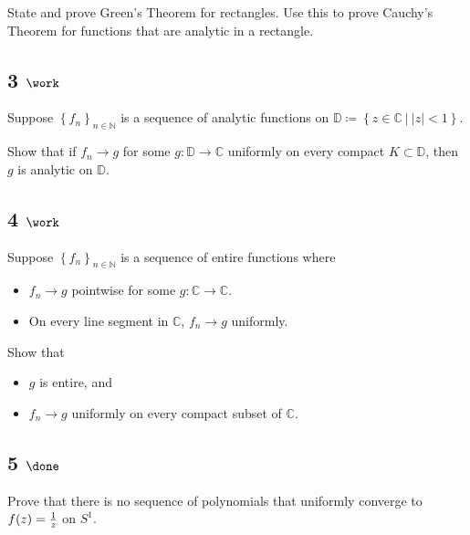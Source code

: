 State and prove Green's Theorem for rectangles. Use this to prove
Cauchy's Theorem for functions that are analytic in a rectangle.

\hypertarget{work-18}{%
\subsection{\texorpdfstring{3
\(\work\)}{3 \textbackslash work}}\label{work-18}}

Suppose \(\left\{{f_n}\right\}_{n\in {\mathbb{N}}}\) is a sequence of
analytic functions on
\({\mathbb{D}}\coloneqq\left\{{z\in {\mathbb{C}}{~\mathrel{\Big|}~}{\left\lvert {z} \right\rvert} < 1}\right\}\).

Show that if \(f_n\to g\) for some \(g: {\mathbb{D}}\to {\mathbb{C}}\)
uniformly on every compact \(K\subset {\mathbb{D}}\), then \(g\) is
analytic on \({\mathbb{D}}\).

\hypertarget{work-19}{%
\subsection{\texorpdfstring{4
\(\work\)}{4 \textbackslash work}}\label{work-19}}

Suppose \(\left\{{f_n}\right\}_{n\in {\mathbb{N}}}\) is a sequence of
entire functions where

\begin{itemize}
\tightlist
\item
  \(f_n \to g\) pointwise for some \(g:{\mathbb{C}}\to{\mathbb{C}}\).
\item
  On every line segment in \({\mathbb{C}}\), \(f_n \to g\) uniformly.
\end{itemize}

Show that

\begin{itemize}
\tightlist
\item
  \(g\) is entire, and
\item
  \(f_n\to g\) uniformly on every compact subset of \({\mathbb{C}}\).
\end{itemize}

\hypertarget{done}{%
\subsection{\texorpdfstring{5
\(\done\)}{5 \textbackslash done}}\label{done}}

Prove that there is no sequence of polynomials that uniformly converge
to \(f(z) = {1\over z}\) on \(S^1\).


